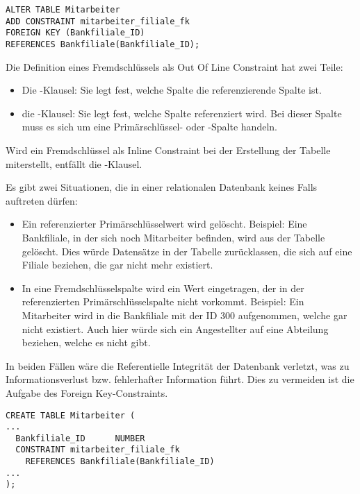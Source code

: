         \begin{lstlisting}[language=oracle_sql,caption={Ein Foreign Key-Constraint als Out Of Line Constraint anlegen},label=sql09_15]
ALTER TABLE Mitarbeiter
ADD CONSTRAINT mitarbeiter_filiale_fk
FOREIGN KEY (Bankfiliale_ID)
REFERENCES Bankfiliale(Bankfiliale_ID);
        \end{lstlisting}
        Die Definition eines Fremdschlüssels als Out Of Line Constraint hat zwei Teile:
        \begin{itemize}
          \item Die -Klausel: Sie legt fest, welche Spalte die referenzierende Spalte ist.
          \item die -Klausel: Sie legt fest, welche Spalte referenziert wird. Bei dieser Spalte muss es sich um eine Primärschlüssel- oder \UNIQUE-Spalte handeln.
        \end{itemize}
        \begin{merke}
          Wird ein Fremdschlüssel als Inline Constraint bei der Erstellung der Tabelle miterstellt, entfällt die -Klausel.
        \end{merke}
       \begin{merke}
          Es gibt zwei Situationen, die in einer relationalen Datenbank keines Falls auftreten dürfen:
          \begin{itemize}
            \item Ein referenzierter Primärschlüsselwert wird gelöscht. Beispiel: Eine Bankfiliale, in der sich noch Mitarbeiter befinden, wird aus der Tabelle  gelöscht. Dies würde Datensätze in der Tabelle  zurücklassen, die sich auf eine Filiale beziehen, die gar nicht mehr existiert.
            \item In eine Fremdschlüsselspalte wird ein Wert eingetragen, der in der referenzierten Primärschlüsselspalte nicht vorkommt. Beispiel: Ein Mitarbeiter wird in die Bankfiliale mit der ID 300 aufgenommen, welche gar nicht existiert. Auch hier würde sich ein Angestellter auf eine Abteilung beziehen, welche es nicht gibt.
        \end{itemize}
        In beiden Fällen wäre die Referentielle Integrität der Datenbank verletzt, was zu Informationsverlust bzw. fehlerhafter Information führt. Dies zu vermeiden ist die Aufgabe des Foreign Key-Constraints.
        \end{merke}
        \begin{lstlisting}[language=oracle_sql,caption={Ein Foreign Key-Constraint als Inline Constraint anlegen},label=sql09_16]
CREATE TABLE Mitarbeiter (
...
  Bankfiliale_ID      NUMBER
  CONSTRAINT mitarbeiter_filiale_fk
    REFERENCES Bankfiliale(Bankfiliale_ID)
...
);
        \end{lstlisting}
